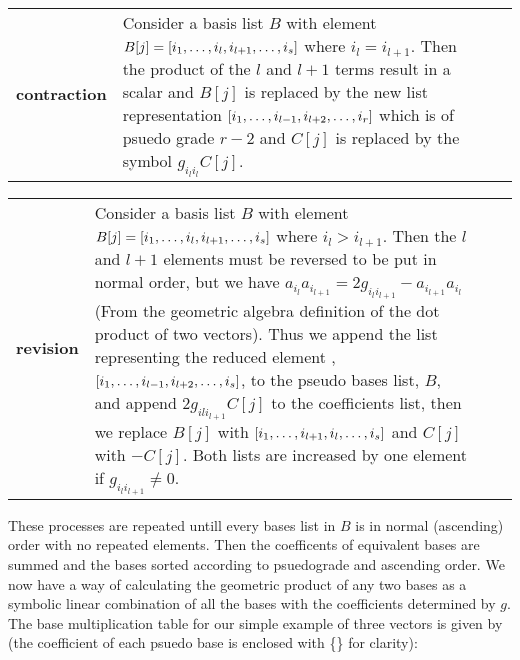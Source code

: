 \documentclass{article}
\begin{document}
\begin{center}
\begin{tabularx}{4.5in}{cXlX}\hline
	{\bf contraction} &  \parbox{3.5in}{\vspace{0.1in}Consider a basis list $B$ with element
						 $B[j] = \left [ i_{1},\dots,i_{l},i_{l+1},\dots,i_{s}\right ]$ where 
					     $i_{l} = i_{l+1}$. Then the product of the $l$ and $l+1$ terms result in a scalar and $B[j]$ is
						replaced by the new list
						 representation $\left [ i_{1},\dots,i_{l-1},i_{l+2},\dots,i_{r}\right ]$ which is of 
						 psuedo grade $r-2$ and $C[j]$ is replaced by the symbol $g_{i_{l}i_{l}}C[j]$.\vspace{0.1in}} \\
						 \hline
\end{tabularx}
\begin{tabularx}{4.5in}{cXlX}\hline 
    {\bf revision}    & \parbox{3.5in}{\vspace{0.1in}Consider a basis list $B$ with element
						 $B[j] = \left [ i_{1},\dots,i_{l},i_{l+1},\dots,i_{s}\right ]$ where 
					     $i_{l} > i_{l+1}$. Then the $l$ and $l+1$ elements must be reversed to be
						 put in normal order,
						 but we have $a_{i_{l}}a_{i_{l+1}} = 2g_{i_{l}i_{l+1}}-
						 a_{i_{l+1}}a_{i_{l}}$ (From the geometric 
						 algebra definition of the dot product of two vectors). Thus
						 we append the list representing the reduced element ,
						 $\left [ i_{1},\dots,i_{l-1},i_{l+2},\dots,i_{s}\right ]$, to the pseudo bases list, $B$, and
						 append $2g_{i{l}i_{l+1}}C[j]$ to the coefficients list, then 
						 we replace $B[j]$ with $\left [ i_{1},\dots,i_{l+1},i_{l},\dots,i_{s}\right ]$ 
					     and $C[j]$ with $-C[j]$. Both lists are increased by one element if 
						 $g_{i_{l}i_{l+1}} \ne 0$.\vspace{0.1in}} \\ \hline
\end{tabularx}
\end{center}

These processes are repeated untill every bases list in $B$ is in normal (ascending) order with no repeated elements.  Then the coefficents of equivalent bases are summed and the bases sorted according to psuedograde
and ascending order.  We now have a way of calculating the geometric product of any two bases as a symbolic linear combination of all the bases with the coefficients determined by $g$. The base multiplication table
for our simple example of three vectors is given by (the coefficient of each psuedo base is enclosed with \{\} for clarity):
\end{document}
